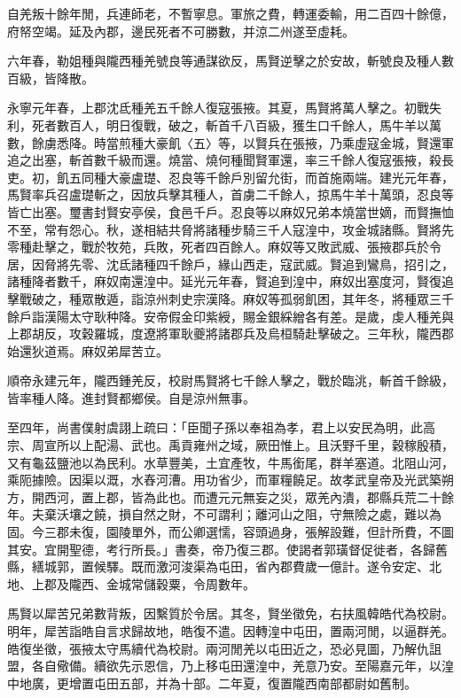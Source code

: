 \begin{pinyinscope}
自羌叛十餘年閒，兵連師老，不暫寧息。軍旅之費，轉運委輸，用二百四十餘億，府帑空竭。延及內郡，邊民死者不可勝數，并涼二州遂至虛耗。

六年春，勒姐種與隴西種羌號良等通謀欲反，馬賢逆擊之於安故，斬號良及種人數百級，皆降散。

永寧元年春，上郡沈氐種羌五千餘人復寇張掖。其夏，馬賢將萬人擊之。初戰失利，死者數百人，明日復戰，破之，斬首千八百級，獲生口千餘人，馬牛羊以萬數，餘虜悉降。時當煎種大豪飢〈五〉等，以賢兵在張掖，乃乘虛寇金城，賢還軍追之出塞，斬首數千級而還。燒當、燒何種聞賢軍還，率三千餘人復寇張掖，殺長吏。初，飢五同種大豪盧璴、忍良等千餘戶別留允街，而首施兩端。建光元年春，馬賢率兵召盧璴斬之，因放兵擊其種人，首虜二千餘人，掠馬牛羊十萬頭，忍良等皆亡出塞。璽書封賢安亭侯，食邑千戶。忍良等以麻奴兄弟本燒當世嫡，而賢撫恤不至，常有怨心。秋，遂相結共脅將諸種步騎三千人寇湟中，攻金城諸縣。賢將先零種赴擊之，戰於牧苑，兵敗，死者四百餘人。麻奴等又敗武威、張掖郡兵於令居，因脅將先零、沈氐諸種四千餘戶，緣山西走，寇武威。賢追到鸞鳥，招引之，諸種降者數千，麻奴南還湟中。延光元年春，賢追到湟中，麻奴出塞度河，賢復追擊戰破之，種眾散遁，詣涼州刺史宗漢降。麻奴等孤弱飢困，其年冬，將種眾三千餘戶詣漢陽太守耿种降。安帝假金印紫綬，賜金銀綵繒各有差。是歲，虔人種羌與上郡胡反，攻穀羅城，度遼將軍耿夔將諸郡兵及烏桓騎赴擊破之。三年秋，隴西郡始還狄道焉。麻奴弟犀苦立。

順帝永建元年，隴西鍾羌反，校尉馬賢將七千餘人擊之，戰於臨洮，斬首千餘級，皆率種人降。進封賢都鄉侯。自是涼州無事。

至四年，尚書僕射虞詡上疏曰：「臣聞子孫以奉祖為孝，君上以安民為明，此高宗、周宣所以上配湯、武也。禹貢雍州之域，厥田惟上。且沃野千里，穀稼殷積，又有龜茲鹽池以為民利。水草豐美，土宜產牧，牛馬銜尾，群羊塞道。北阻山河，乘阨據險。因渠以溉，水舂河漕。用功省少，而軍糧饒足。故孝武皇帝及光武築朔方，開西河，置上郡，皆為此也。而遭元元無妄之災，眾羌內潰，郡縣兵荒二十餘年。夫棄沃壤之饒，損自然之財，不可謂利；離河山之阻，守無險之處，難以為固。今三郡未復，園陵單外，而公卿選懦，容頭過身，張解設難，但計所費，不圖其安。宜開聖德，考行所長。」書奏，帝乃復三郡。使謁者郭璜督促徙者，各歸舊縣，繕城郭，置候驛。既而激河浚渠為屯田，省內郡費歲一億計。遂令安定、北地、上郡及隴西、金城常儲穀粟，令周數年。

馬賢以犀苦兄弟數背叛，因繫質於令居。其冬，賢坐徵免，右扶風韓皓代為校尉。明年，犀苦詣皓自言求歸故地，皓復不遣。因轉湟中屯田，置兩河閒，以逼群羌。皓復坐徵，張掖太守馬續代為校尉。兩河閒羌以屯田近之，恐必見圖，乃解仇詛盟，各自儆備。續欲先示恩信，乃上移屯田還湟中，羌意乃安。至陽嘉元年，以湟中地廣，更增置屯田五部，并為十部。二年夏，復置隴西南部都尉如舊制。


\end{pinyinscope}
